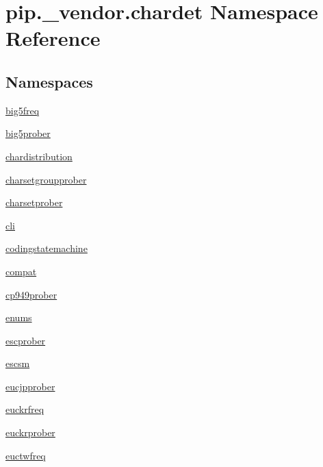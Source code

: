 \hypertarget{namespacepip_1_1__vendor_1_1chardet}{}\section{pip.\+\_\+vendor.\+chardet Namespace Reference}
\label{namespacepip_1_1__vendor_1_1chardet}
\subsection*{Namespaces}
\begin{DoxyCompactItemize}
\item 
 \hyperlink{namespacepip_1_1__vendor_1_1chardet_1_1big5freq}{big5freq}
\item 
 \hyperlink{namespacepip_1_1__vendor_1_1chardet_1_1big5prober}{big5prober}
\item 
 \hyperlink{namespacepip_1_1__vendor_1_1chardet_1_1chardistribution}{chardistribution}
\item 
 \hyperlink{namespacepip_1_1__vendor_1_1chardet_1_1charsetgroupprober}{charsetgroupprober}
\item 
 \hyperlink{namespacepip_1_1__vendor_1_1chardet_1_1charsetprober}{charsetprober}
\item 
 \hyperlink{namespacepip_1_1__vendor_1_1chardet_1_1cli}{cli}
\item 
 \hyperlink{namespacepip_1_1__vendor_1_1chardet_1_1codingstatemachine}{codingstatemachine}
\item 
 \hyperlink{namespacepip_1_1__vendor_1_1chardet_1_1compat}{compat}
\item 
 \hyperlink{namespacepip_1_1__vendor_1_1chardet_1_1cp949prober}{cp949prober}
\item 
 \hyperlink{namespacepip_1_1__vendor_1_1chardet_1_1enums}{enums}
\item 
 \hyperlink{namespacepip_1_1__vendor_1_1chardet_1_1escprober}{escprober}
\item 
 \hyperlink{namespacepip_1_1__vendor_1_1chardet_1_1escsm}{escsm}
\item 
 \hyperlink{namespacepip_1_1__vendor_1_1chardet_1_1eucjpprober}{eucjpprober}
\item 
 \hyperlink{namespacepip_1_1__vendor_1_1chardet_1_1euckrfreq}{euckrfreq}
\item 
 \hyperlink{namespacepip_1_1__vendor_1_1chardet_1_1euckrprober}{euckrprober}
\item 
 \hyperlink{namespacepip_1_1__vendor_1_1chardet_1_1euctwfreq}{euctwfreq}
\item 

\end{DoxyCompactItemize}
